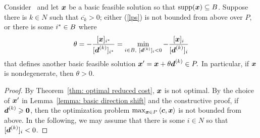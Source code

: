 \begin{theorem}\label{thm:move-feasible}
Consider \LPSA~and let ${\boldsymbol x}$ be a basic feasible solution so that $\operatorname{supp}({\boldsymbol x})\subseteq B$. Suppose there is $k \in N$ such that $\overline{c_k} > 0$; either (\ref{lps}) is not bounded from above over $P$, or there is some $i^\ast \in B$ where
\[ \theta = - \frac{[{\boldsymbol x}]_{i^\ast}}{ [{\boldsymbol d}^{(k)}]_{i^\ast} } = \min_{i \in B,~ [{\boldsymbol d}^{(k)}]_{i} < 0}  - \frac{[{\boldsymbol x}]_{i}}{ [{\boldsymbol d}^{(k)}]_{i}} \] that defines another basic feasible solution
$ {\boldsymbol x}' =  {\boldsymbol x} + \theta {\boldsymbol d}^{(k)} \in P.$ In particular, if ${\boldsymbol x}$ is nondegenerate, then $\theta > 0 $. 
\end{theorem}
\begin{proof}
By Theorem~\ref{thm: optimal reduced cost}, ${\boldsymbol x}$ is not optimal. By the choice of ${\boldsymbol x}'$ in Lemma~\ref{lemma: basic direction shift} and the constructive proof, if ${\boldsymbol d}^{(k)} \geqslant \boldsymbol0$, then the optimization problem $\max_{{\boldsymbol x}\in P}\left\langle{\boldsymbol c}, {\boldsymbol x}\right\rangle$ is not bounded from above. In the following, we may assume that there is some $i \in N$ so that $[{\boldsymbol d}^{(k)}]_i < 0$. 


\end{proof}
